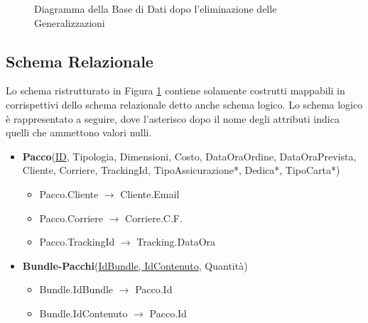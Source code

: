 \begin{figure}[H]
\centering
\caption{Diagramma della Base di Dati dopo l'eliminazione delle Generalizzazioni}
\label{ML}
\end{figure}
\newpage

\subsection{Schema Relazionale}
Lo schema ristrutturato in Figura \ref{ML} contiene solamente costrutti mappabili in corrispettivi dello schema relazionale detto anche schema logico. Lo schema logico è rappresentato a seguire, dove l'asterisco dopo il nome degli attributi indica quelli che ammettono valori nulli.
\begin{itemize}
    \setlength{\itemindent}{+0in}
    \item \textbf{Pacco}(\underline{ID}, Tipologia, Dimensioni, Costo, DataOraOrdine, DataOraPrevista, Cliente, Corriere, TrackingId, TipoAssicurazione*, Dedica*, TipoCarta*)
        \begin{itemize}
            \setlength{\itemindent}{+.2in}
            \item Pacco.Cliente $\rightarrow$ Cliente.Email 
            \item Pacco.Corriere $\rightarrow$ Corriere.C.F.
            \item Pacco.TrackingId $\rightarrow$ Tracking.DataOra
        \end{itemize}
    \item \textbf{Bundle-Pacchi}(\underline{IdBundle, IdContenuto}, Quantità)
        \begin{itemize}
            \setlength{\itemindent}{+.2in}
            \item Bundle.IdBundle $\rightarrow$ Pacco.Id 
            \item Bundle.IdContenuto $\rightarrow$ Pacco.Id
        \end{itemize}
        

\end{itemize}
